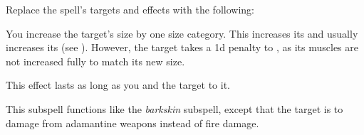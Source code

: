 Replace the spell's targets and effects with the following:
\begin{spellcontent}

\begin{augmenttargetinginfo}



\end{augmenttargetinginfo}


\begin{augmenteffects}



\spelleffect
You increase the target's size by one size category.
This increases its  and usually increases its  (see ).
However, the target takes a \minus1d penalty to , as its muscles are not increased fully to match its new size.

This effect lasts as long as you and the target  to it.








\end{augmenteffects}

\end{spellcontent}






This subspell functions like the \textit{barkskin} subspell, except that the target is  to damage from adamantine weapons instead of fire damage.









